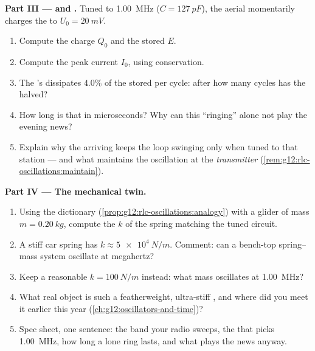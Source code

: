 \begin{problem}
\medskip
\noindent\textbf{Part III ---  and .}
Tuned to \qty{1.00}{MHz} ($C = \qty{127}{pF}$), the aerial momentarily
charges the  to $U_0 = \qty{20}{mV}$.
\begin{enumerate}[resume]
  \item Compute the charge $Q_0$ and the stored  $E$.
  \item Compute the peak current $I_0$, using  conservation.
  \item The 's  dissipates $4.0\%$ of the stored 
        per cycle: after how many cycles has the  halved?
  \item How long is that in microseconds? Why can this ``ringing''
        alone not play the evening news?
  \item Explain why the arriving  keeps the loop swinging only
        when tuned to that station --- and what maintains the
        oscillation at the \emph{transmitter}
        (\cref{rem:g12:rlc-oscillations:maintain}).
\end{enumerate}

\medskip
\noindent\textbf{Part IV --- The mechanical twin.}
\begin{enumerate}[resume]
  \item Using the dictionary (\cref{prop:g12:rlc-oscillations:analogy})
        with a glider of mass $m = \qty{0.20}{kg}$, compute the
         $k$ of the spring matching the tuned circuit.
  \item A stiff car spring has $k \approx \qty{5e4}{N/m}$. Comment:
        can a bench-top spring--mass system oscillate at megahertz?
  \item Keep a reasonable $k = \qty{100}{N/m}$ instead: what mass
        oscillates at \qty{1.00}{MHz}?
  \item What real object is such a featherweight, ultra-stiff
        , and where did you meet it earlier this
        year (\cref{ch:g12:oscillators-and-time})?
  \item Spec sheet, one sentence: the band your radio sweeps, the
         that picks \qty{1.00}{MHz}, how long a lone ring
        lasts, and what plays the news anyway.
\end{enumerate}
\end{problem}
